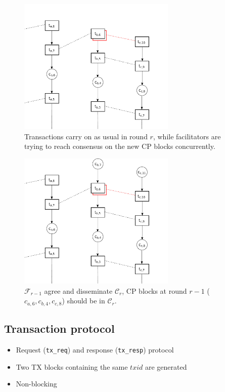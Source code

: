 \documentclass{beamer}
\newcommand{\C}{\mathcal{C}}
\newcommand{\F}{\mathcal{F}}
\begin{document}
\begin{frame}{\subsecname}
  \begin{figure}[h]
  \includegraphics[width=0.67\textwidth]{trustchain-3}
  \centering
  \caption*{Transactions carry on as usual in round $r$,
  while facilitators are trying to reach consensus on the new CP blocks concurrently.}
  \end{figure}
\end{frame}

\begin{frame}{\subsecname}
  \begin{figure}[h]
  \includegraphics[width=0.67\textwidth]{trustchain-4}
  \centering
  \caption*{$\F_{r-1}$ agree and disseminate $\C_r$,
  CP blocks at round $r-1$ ($c_{a, 6}, c_{b, 4}, c_{c,8}$) should be in $\C_r$.}
  \end{figure}
\end{frame}

\subsection{Transaction protocol}
\begin{frame}{\subsecname}
\begin{itemize}
\item Request (\texttt{tx\_req}) and response (\texttt{tx\_resp}) protocol
\item Two TX blocks containing the same $txid$ are generated
\item Non-blocking
\end{itemize}
\end{frame}
\end{document}
